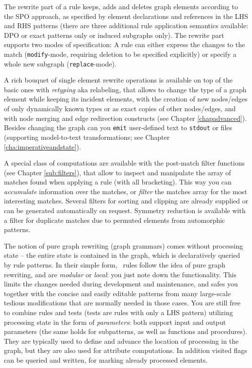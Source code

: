 The rewrite part of a rule keeps, adds and deletes graph elements according to the SPO approach, as specified by element declarations and references in the LHS and RHS patterns (there are three additional rule application semantics available: DPO or exact patterns only or induced subgraphs only).
The rewrite part supports two modes of specification: A rule can either express the changes to the match (\texttt{modify}-mode, requiring deletion to be specified explicitly) or specify a whole new subgraph (\texttt{replace}-mode).

A rich bouquet of single element rewrite operations is available on top of the basic ones with \emph{retyping} aka relabeling, that allows to change the type of a graph element while keeping its incident elements, with the creation of new nodes/edges of only dynamically known types or as exact copies of other nodes/edges, and with node merging and edge redirection constructs (see Chapter \ref{chapadvanced}).
Besides changing the graph can you \texttt{emit} user-defined text to \texttt{stdout} or files (supporting model-to-text transformations; see Chapter \ref{cha:imperativeandstate}).

A special class of computations are available with the post-match filter functions (see Chapter \ref{sub:filters}), that allow to inspect and manipulate the array of matches found when applying a rule (with all bracketing). 
This way you can \emph{accumulate} information over the matches, or \emph{filter} the matches array for the most interesting matches.
Several filters for sorting and clipping are already supplied or can be generated automatically on request.
Symmetry reduction is available with a filter for duplicate matches due to permuted elements from automorphic patterns.

The notion of pure graph rewriting (graph grammars) comes without processing state -- the entire state is contained in the graph, which is declaratively queried by rule patterns.
In their simple form, \GrG\ rules follow the idea of pure graph rewriting, and are \emph{modular} or \emph{local}: you just note down the functionality.
This limits the changes needed during development and maintenance, and safes you together with the concise and easily editable patterns from many large-scale tedious modifications that are normally needed in those cases.
You are still free to combine rules and tests (tests are rules with only a LHS pattern) utilizing processing state in the form of \emph{parameters}: both support input and output parameters (the same holds for subpatterns, as well as functions and procedures).
They are typically used to define and advance the location of processing in the graph, but they are also used for attribute computations.
In addition visited flags can be queried and written, for marking already processed elements.

